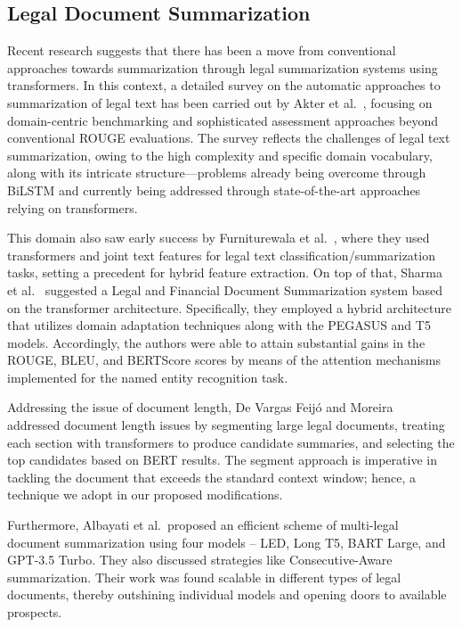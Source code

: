 \documentclass{llncs}
\begin{document}
\subsection{Legal Document Summarization}
Recent research suggests that there has been a move from conventional approaches towards summarization through legal summarization systems using transformers. In this context, a detailed survey on the automatic approaches to summarization of legal text has been carried out by Akter et al.~\cite{akter2025legal}, focusing on domain-centric benchmarking and sophisticated assessment approaches beyond conventional ROUGE evaluations. The survey reflects the challenges of legal text summarization, owing to the high complexity and specific domain vocabulary, along with its intricate structure—problems already being overcome through BiLSTM and currently being addressed through state-of-the-art approaches relying on transformers.

This domain also saw early success by Furniturewala et al.~\cite{furniturewala2021legal}, where they used transformers and joint text features for legal text classification/summarization tasks, setting a precedent for hybrid feature extraction.
On top of that, Sharma et al.~\cite{sharma2024legal} suggested a Legal and Financial Document Summarization system based on the transformer architecture. Specifically, they employed a hybrid architecture that utilizes domain adaptation techniques along with the PEGASUS and T5 models. Accordingly, the authors were able to attain substantial gains in the ROUGE, BLEU, and BERTScore scores by means of the attention mechanisms implemented for the named entity recognition task.


Addressing the issue of document length, De Vargas Feijó and Moreira~\cite{vargas2023legal} addressed document length issues by segmenting large legal documents, treating each section with transformers to produce candidate summaries, and selecting the top candidates based on BERT results. The segment approach is imperative in tackling the document that exceeds the standard context window; hence, a technique we adopt in our proposed modifications.

Furthermore, Albayati et al.~\cite{albayati2025multi}proposed an efficient scheme of multi-legal document summarization using four models – LED, Long T5, BART Large, and GPT-3.5 Turbo. They also discussed strategies like Consecutive-Aware summarization. Their work was found scalable in different types of legal documents, thereby outshining individual models and opening doors to available prospects.
\end{document}
